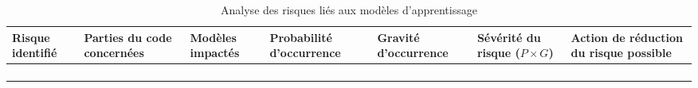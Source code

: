     \begin{table}[h!]
        \centering
        \caption{Analyse des risques liés aux modèles d'apprentissage}\label{tab:table3}
        \begin{adjustbox}{width=\textwidth}
        \begin{tabular}{p{4cm} p{4cm} p{3cm} p{3cm} p{3cm} p{3cm} p{5cm}}
            \toprule
            \textbf{Risque identifié} &
            \textbf{Parties du code concernées} &
            \textbf{Modèles impactés} &
            \textbf{Probabilité d'occurrence} &
            \textbf{Gravité d'occurrence} &
            \textbf{Sévérité du risque ($P \times G$)} &
            \textbf{Action de réduction du risque possible} \\
            \midrule
            &  &  &  &  &  &  \\
            &  &  &  &  &  &  \\
            &  &  &  &  &  &  \\
            &  &  &  &  &  &  \\
            \bottomrule
        \end{tabular}
        \label{tab:analyse_risques}
        \end{adjustbox}
    \end{table}

